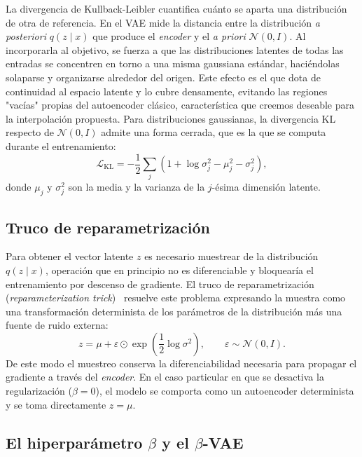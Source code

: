\documentclass[12pt,a4paper,twoside]{tesis}
\begin{document}
La divergencia de Kullback-Leibler cuantifica cuánto se aparta una distribución de otra de referencia. En el VAE mide la distancia entre la distribución \textit{a posteriori} $q(z \mid x)$ que produce el \textit{encoder} y el \textit{a priori} $\mathcal{N}(0, I)$. Al incorporarla al objetivo, se fuerza a que las distribuciones latentes de todas las entradas se concentren en torno a una misma gaussiana estándar, haciéndolas solaparse y organizarse alrededor del origen. Este efecto es el que dota de continuidad al espacio latente y lo cubre densamente, evitando las regiones "vacías" propias del autoencoder clásico, característica que creemos deseable para la interpolación propuesta. Para distribuciones gaussianas, la divergencia KL respecto de $\mathcal{N}(0, I)$ admite una forma cerrada, que es la que se computa durante el entrenamiento:
\begin{equation}
\mathcal{L}_{\mathrm{KL}} = -\frac{1}{2}\sum_j \left(1 + \log\sigma_j^2 - \mu_j^2 - \sigma_j^2\right),
\end{equation}
donde $\mu_j$ y $\sigma_j^2$ son la media y la varianza de la $j$-ésima dimensión latente.

\subsection{Truco de reparametrización}

Para obtener el vector latente $z$ es necesario muestrear de la distribución $q(z \mid x)$, operación que en principio no es diferenciable y bloquearía el entrenamiento por descenso de gradiente. El truco de reparametrización (\textit{reparameterization trick})~\cite{kingma2013auto} resuelve este problema expresando la muestra como una transformación determinista de los parámetros de la distribución más una fuente de ruido externa:
\begin{equation}
z = \mu + \varepsilon \odot \exp\left(\frac{1}{2}\log\sigma^2\right), \qquad \varepsilon \sim \mathcal{N}(0, I).
\end{equation}
De este modo el muestreo conserva la diferenciabilidad necesaria para propagar el gradiente a través del \textit{encoder}. En el caso particular en que se desactiva la regularización ($\beta = 0$), el modelo se comporta como un autoencoder determinista y se toma directamente $z = \mu$.

\subsection{El hiperparámetro $\beta$ y el $\beta$-VAE}
\end{document}
